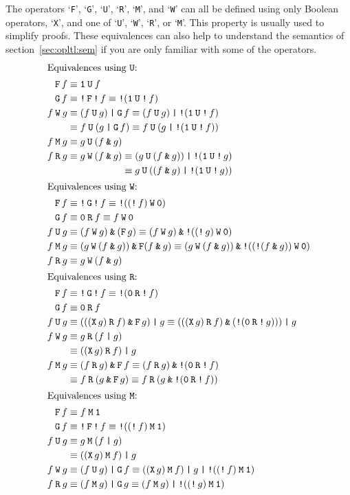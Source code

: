 \documentclass[a4paper,twoside,10pt,DIV=12]{scrreprt}
\DeclareMathOperator{\F}{\texttt{F}}
\DeclareMathOperator{\G}{\texttt{G}}
\newcommand{\U}{\mathbin{\texttt{U}}}
\newcommand{\R}{\mathbin{\texttt{R}}}
\DeclareMathOperator{\X}{\texttt{X}}
\newcommand{\M}{\mathbin{\texttt{M}}}
\newcommand{\W}{\mathbin{\texttt{W}}}
\DeclareMathOperator{\NOT}{\texttt{!}}
\newcommand{\OR}{\mathbin{\texttt{|}}}
\newcommand{\AND}{\mathbin{\texttt{\&}}}
\newcommand{\0}{\texttt{0}}
\newcommand{\1}{\texttt{1}}
\newcommand\samp[1]{`\texttt{#1}'}
\begin{document}
The operators \samp{F}, \samp{G}, \samp{U}, \samp{R}, \samp{M}, and
\samp{W} can all be defined using only Boolean operators, \samp{X},
and one of \samp{U}, \samp{W}, \samp{R}, or \samp{M}.  This property
is usually used to simplify proofs.  These equivalences can also help
to understand the semantics of section~\ref{sec:opltl:sem} if you are
only familiar with some of the operators.
{\allowdisplaybreaks
\begin{align*}
\intertext{Equivalences using $\U$:}
  \F f &\equiv \1\U f\\
  \G f &\equiv \NOT\F\NOT f\equiv \NOT(\1\U\NOT f)\\
  f\W g &\equiv (f\U g)\OR\G f\equiv (f\U g)\OR\NOT(\1\U\NOT f)\\
        &\equiv f\U (g\OR \G f)\equiv f\U (g\OR\NOT(\1\U\NOT f))\\
  f\M g &\equiv g \U (f\AND g)\\
  f\R g &\equiv g \W (f\AND g) \equiv (g \U (f\AND g))\OR\NOT(\1\U\NOT g)\\
        &\phantom{{}\equiv g \W (f\AND g)} \equiv g \U ((f\AND g)\OR\NOT(\1\U\NOT g))\\
\intertext{Equivalences using $\W$:}
  \F f &\equiv \NOT\G\NOT f\equiv \NOT((\NOT f)\W\0)\\
  \G f &\equiv \0\R f \equiv f\W \0\\
  f\U g &\equiv (f \W g)\AND(\F g)\equiv (f \W g)\AND\NOT((\NOT g)\W\0)\\
  f\M g &\equiv (g \W (f\AND g))\AND\F(f\AND g)\equiv(g \W (f\AND g))\AND\NOT((\NOT (f\AND g))\W\0)\\
  f\R g &\equiv g \W (f\AND g)\\
\intertext{Equivalences using $\R$:}
  \F f &\equiv \NOT\G\NOT f\equiv \NOT (\0\R\NOT f)\\
  \G f &\equiv \0 \R f \\
  f\U g&\equiv (((\X g) \R f)\AND\F g)\OR g \equiv (((\X g) \R f)\AND(\NOT (\0\R\NOT g)))\OR g \\
  f \W g&\equiv g\R(f\OR g)\\
        &\equiv ((\X g)\R f)\OR g\\
  f \M g&\equiv (f \R g)\AND\F f\equiv (f \R g)\AND\NOT (\0\R\NOT f)\\
        &\equiv f \R (g\AND\F g)\equiv f \R (g\AND\NOT (\0\R\NOT f))\\
\intertext{Equivalences using $\M$:}
  \F f &\equiv f\M\1\\
  \G f &\equiv \NOT\F\NOT f \equiv \NOT((\NOT f)\M\1)\\
  f\U g&\equiv g\M (f\OR g) \\
       &\equiv ((\X g)\M f)\OR g \\
  f \W g&\equiv (f\U g)\OR \G f \equiv ((\X g)\M f)\OR g\OR \NOT((\NOT f)\M\1)\\
  f \R g&\equiv (f \M g)\OR\G g \equiv (f \M g)\OR \NOT((\NOT g)\M\1)
\end{align*}}
\end{document}
